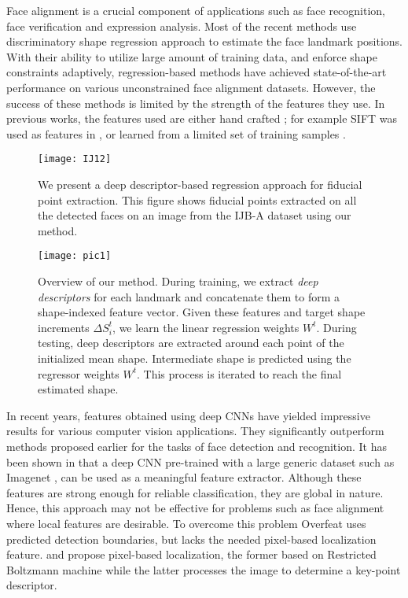 \documentclass[10pt,twocolumn,letterpaper]{article}
\begin{document}
Face alignment is a crucial component of applications such as face recognition, face verification and expression analysis. Most of the recent methods use discriminatory shape regression approach to estimate the face landmark positions. With their ability to utilize large amount of training data, and enforce shape constraints adaptively, regression-based methods have achieved state-of-the-art performance on various unconstrained face alignment datasets. However, the success of these methods is limited by the strength of the features they use. In previous works, the features used are either hand crafted ; for example SIFT was used as features in \cite{XiongD13}, or learned from a limited set of training samples \cite{DBLP:journals/ijcv/CaoWWS14,DBLP:conf/cvpr/RenCW014}.

\begin{figure}[t]
\label{overview_fig}
\begin{center}
\texttt{[image: IJ12]}
\end{center}
\vskip-10pt
\caption{We present a deep descriptor-based regression approach for fiducial point extraction.  This figure shows fiducial points extracted on all the detected faces on an image from the IJB-A\cite{F._2015_CVPR} dataset using our method.}
\end{figure}


\begin{figure*}[t]
\begin{center}
\texttt{[image: pic1]}
\end{center}
\vskip-17pt
\caption{Overview of our method. During training, we extract \textit{deep descriptors} for each landmark  and concatenate them to form a shape-indexed feature vector. Given these features and target shape increments $\Delta S_{i}^t$, we learn the linear regression weights \textit{$W^t$}. During testing, deep descriptors are extracted around each point of the initialized mean shape. Intermediate shape is predicted using the regressor weights \textit{$W^t$}. This process is iterated to reach the final estimated shape.}\label{overview}
\end{figure*}

In recent years, features obtained using deep CNNs have yielded impressive results for various computer vision applications. They significantly outperform methods proposed earlier for the tasks of face detection and recognition. It has been shown in \cite{NIPS2012_4824} that a deep CNN pre-trained with a large generic dataset such as Imagenet \cite{ILSVRC15}, can be used as a meaningful feature extractor. Although these features are strong enough for reliable classification, they are global in nature. Hence, this approach may not be effective for problems such as face alignment where local features are desirable. To overcome this problem Overfeat \cite{sermanet-iclr-14}  uses predicted detection boundaries, but  lacks the needed pixel-based localization feature. \cite{Taylor:2010:CLS:1888212.1888225} and \cite{10.1109/TPAMI.2012.231} propose pixel-based localization, the former based on Restricted Boltzmann machine while the latter processes the image to determine a key-point descriptor.
\end{document}

